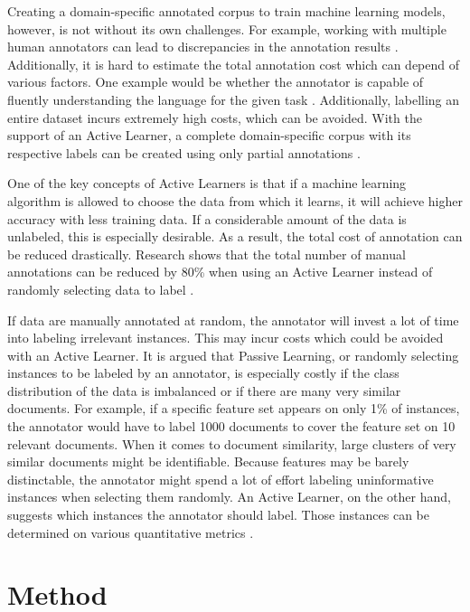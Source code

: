 \documentclass[11pt, a4paper]{article}
\begin{document}
Creating a domain-specific annotated corpus to train machine learning models, however, is not without its own challenges. 
For example, working with multiple human annotators can lead to discrepancies in the annotation results \citep{kim2008corpusannotation, rayan2019sentimentanalysisemail}. 
Additionally, it is hard to estimate the total annotation cost which can depend of various factors. One example would be whether the annotator is capable of fluently understanding 
the language for the given task \citep{arora2009estimationgannotationcost}. Additionally, labelling an entire dataset incurs extremely high costs, 
which can be avoided. With the support of an Active Learner, a complete domain-specific corpus with its respective labels can be 
created using only partial annotations \citep{park2015EfficientExtraction}. 

One of the key concepts of Active Learners is that if a machine learning algorithm is allowed to choose the data from which it learns, 
it will achieve higher accuracy with less training data. If a considerable amount of the data is unlabeled, this is especially desirable. 
As a result, the total cost of annotation can be reduced drastically. Research shows that the total number of 
manual annotations can be reduced by 80\% when using an Active Learner instead of randomly 
selecting data to label \citep{baldridgeosborne2004active}.

If data are manually annotated at random, the annotator will invest a lot of time into labeling irrelevant instances. 
This may incur costs which could be avoided with an Active Learner. It is argued that Passive Learning, or randomly selecting instances 
to be labeled by an annotator, is especially costly if the class distribution of the data is imbalanced or if there are many very similar documents. 
For example, if a specific feature set appears on only 1\% of instances, the annotator would have to label 1000 documents to cover 
the feature set on 10 relevant documents. When it comes to document similarity, large clusters of very similar documents might be 
identifiable. Because features may be barely distinctable, the annotator might spend a lot of effort labeling uninformative instances 
when selecting them randomly. An Active Learner, on the other hand, suggests which instances the annotator should label. Those instances can be 
determined on various quantitative metrics \citep{miller2020activelearningapproaches}.

\section{Method}
\end{document}
